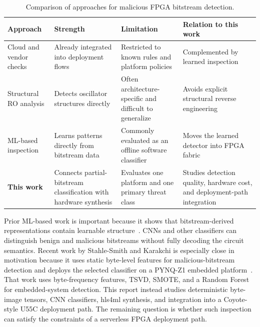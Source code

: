 \begin{table}[t]
    \centering
    \caption{Comparison of approaches for malicious FPGA bitstream detection.}
    \label{tab:prior-work-gap}

    \small
    \setlength{\tabcolsep}{5pt}
    \renewcommand{\arraystretch}{1.18}

    \begin{tabularx}{\linewidth}{
        @{}
        >{\hsize}Y
        >{\hsize}Y
        >{\hsize}Y
        >{\hsize}Y
        @{}
    }
        \toprule
        \textbf{Approach} &
        \textbf{Strength} &
        \textbf{Limitation} &
        \textbf{Relation to this work} \\
        \midrule

        Cloud and vendor checks &
        Already integrated into deployment flows &
        Restricted to known rules and platform policies &
        Complemented by learned inspection \\
        \addlinespace[0.45em]

        Structural RO analysis &
        Detects oscillator structures directly &
        Often architecture-specific and difficult to generalize &
        Avoids explicit structural reverse engineering \\
        \addlinespace[0.45em]

        ML-based inspection &
        Learns patterns directly from bitstream data &
        Commonly evaluated as an offline software classifier &
        Moves the learned detector into FPGA fabric \\
        \midrule

        \textbf{This work} &
        Connects partial-bitstream classification with hardware synthesis &
        Evaluates one platform and one primary threat class &
        Studies detection quality, hardware cost, and deployment-path integration \\
        \bottomrule
    \end{tabularx}
\end{table}
Prior ML-based work is important because it shows that bitstream-derived representations contain learnable structure~\cite{rettkowski2019inspection,chaudhuri2022detection,elnaggar2023learning,palumbo2022trojan}. CNNs and other classifiers can distinguish benign and malicious bitstreams without fully decoding the circuit semantics. Recent work by Stahle-Smith and Karakchi is especially close in motivation because it uses static byte-level features for malicious-bitstream detection and deploys the selected classifier on a PYNQ-Z1 embedded platform~\cite{stahlesmith2025realtime}. That work uses byte-frequency features, TSVD, SMOTE, and a Random Forest for embedded-system detection. This report instead studies deterministic byte-image tensors, CNN classifiers, hls4ml synthesis, and integration into a Coyote-style U55C deployment path. The remaining question is whether such inspection can satisfy the constraints of a serverless FPGA deployment path.

